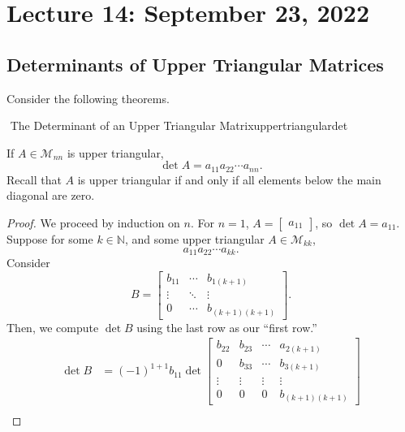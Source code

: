         \pagebreak

\section{Lecture 14: September 23, 2022}

    \subsection{Determinants of Upper Triangular Matrices}

        Consider the following theorems.
        \begin{theorem}{\Stop\,\,The Determinant of an Upper Triangular Matrix}{uppertriangulardet}

            If \(A\in\mathcal{M}_{nn}\) is upper triangular, 
            \begin{equation*}
                \det A = a_{11} a_{22} \cdots a_{nn}.
            \end{equation*}
            Recall that \(A\) is upper triangular if and only if all elements below the main diagonal are zero.
            \begin{proof}
                We proceed by induction on \(n\). For \(n=1\), \(A=\begin{bmatrix} a_{11} \end{bmatrix}\), so \(\det A = a_{11}\). Suppose for some \(k\in\mathbb{N}\), and some upper triangular \(A\in\mathcal{M}_{kk}\),
                \begin{equation*}
                    a_{11} a_{22} \cdots a_{kk}.
                \end{equation*}
                Consider 
                \begin{equation*}
                    B=\begin{bmatrix}
                        b_{11} & \cdots & b_{1(k+1)} \\
                        \vdots & \ddots & \vdots \\
                        0 & \cdots & b_{(k+1)(k+1)}
                    \end{bmatrix}.
                \end{equation*}
                Then, we compute \(\det B\) using the last row as our ``first row.''
                \begin{align*}
                    \det B &= (-1)^{1+1}b_{11}\det\begin{bmatrix} b_{22} & b_{23} & \cdots & a_{2(k+1)} \\ 0 & b_{33} & \cdots & b_{3(k+1)} \\ \vdots & \vdots & \vdots & \vdots \\ 0 & 0 & 0 & b_{(k+1)(k+1)} \end{bmatrix} \\

\end{align*}
\end{proof}
\end{theorem}
